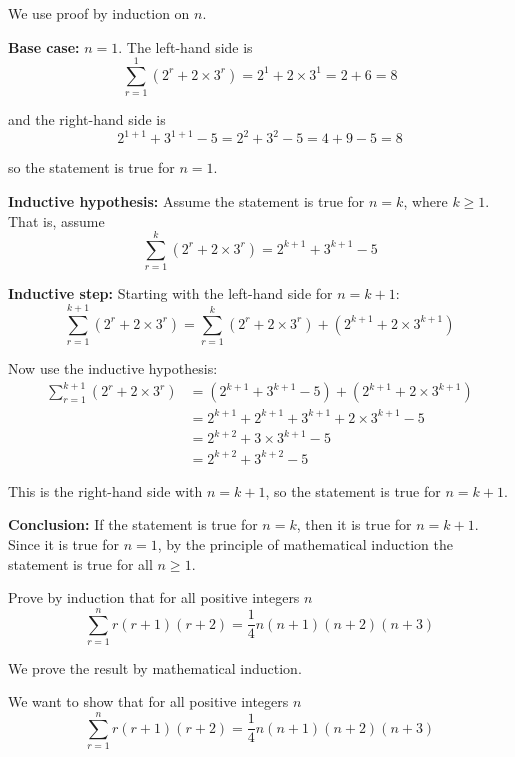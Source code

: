 \documentclass[leqno]{article}
\begin{document}
\begin{enumerate}[
  label=\textbf{\arabic*.},
  leftmargin=*,
  topsep=0pt,
  partopsep=0pt,
  parsep=0pt
]
\vspace*{10pt}

\begin{djsSolution}
We use proof by induction on $n$.

\textbf{Base case:} $n=1$. The left-hand side is
\[
\sum_{r=1}^{1}\left(2^r+2\times 3^r\right)=2^1+2\times 3^1=2+6=8
\]

and the right-hand side is
\[
2^{1+1}+3^{1+1}-5=2^2+3^2-5=4+9-5=8
\]

so the statement is true for $n=1$.

\textbf{Inductive hypothesis:} Assume the statement is true for $n=k$, where $k\geq 1$. That is, assume
\[
\sum_{r=1}^{k}\left(2^r+2\times 3^r\right)=2^{k+1}+3^{k+1}-5
\]

\textbf{Inductive step:} Starting with the left-hand side for $n=k+1$:
\[
\sum_{r=1}^{k+1}\left(2^r+2\times 3^r\right)
=\sum_{r=1}^{k}\left(2^r+2\times 3^r\right)+\left(2^{k+1}+2\times 3^{k+1}\right)
\]

Now use the inductive hypothesis:
\begin{align*}
\sum_{r=1}^{k+1}\left(2^r+2\times 3^r\right)
&=\left(2^{k+1}+3^{k+1}-5\right)+\left(2^{k+1}+2\times 3^{k+1}\right)\\
&=2^{k+1}+2^{k+1}+3^{k+1}+2\times 3^{k+1}-5\\
&=2^{k+2}+3\times 3^{k+1}-5\\
&=2^{k+2}+3^{k+2}-5
\end{align*}

This is the right-hand side with $n=k+1$, so the statement is true for $n=k+1$.

\textbf{Conclusion:} If the statement is true for $n=k$, then it is true for $n=k+1$. Since it is true for $n=1$, by the principle of mathematical induction the statement is true for all $n \geq 1$.
\end{djsSolution}


\newpage

\questionitem

Prove by induction that for all positive integers $n$
\[
\sum_{r=1}^{n} r(r+1)(r+2)=\frac{1}{4}n(n+1)(n+2)(n+3)
\]

\vspace*{10pt}

\begin{djsSolution}
We prove the result by mathematical induction.

We want to show that for all positive integers $n$
\[
\sum_{r=1}^{n} r(r+1)(r+2)=\frac{1}{4}n(n+1)(n+2)(n+3)
\]


\end{djsSolution}
\end{enumerate}
\end{document}
